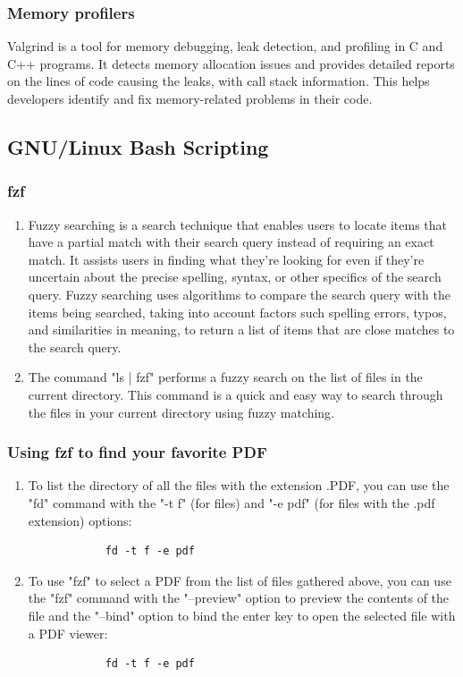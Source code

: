 \documentclass[titlepage]{article}
\begin{document}
	\subsubsection{Memory profilers}
	Valgrind is a tool for memory debugging, leak detection, and profiling in C and C++ programs. It detects memory allocation issues and provides detailed reports on the lines of code causing the leaks, with call stack information. This helps developers identify and fix memory-related problems in their code.
	
	\subsection{GNU/Linux Bash Scripting}
	\subsubsection{fzf}
	\begin{enumerate}
		\item Fuzzy searching is a search technique that enables users to locate items that have a partial match with their search query instead of requiring an exact match. It assists users in finding what they're looking for even if they're uncertain about the precise spelling, syntax, or other specifics of the search query. Fuzzy searching uses algorithms to compare the search query with the items being searched, taking into account factors such spelling errors, typos, and similarities in meaning, to return a list of items that are close matches to the search query. \\
		\item The command "ls | fzf" performs a fuzzy search on the list of files in the current directory. This command is a quick and easy way to search through the files in your current directory using fuzzy matching.
	\end{enumerate}
	
	\subsubsection{Using fzf to find your favorite PDF}
	\begin{enumerate}
		\item To list the directory of all the files with the extension .PDF, you can use the "fd" command with the "-t f" (for files) and "-e pdf" (for files with the .pdf extension) options:
			\begin{verbatim}
			fd -t f -e pdf
			\end{verbatim}
		\item To use "fzf" to select a PDF from the list of files gathered above, you can use the "fzf" command with the "--preview" option to preview the contents of the file and the "--bind" option to bind the enter key to open the selected file with a PDF viewer:
			\begin{verbatim}
			fd -t f -e pdf
			\end{verbatim}
	\end{enumerate}
\end{document}
